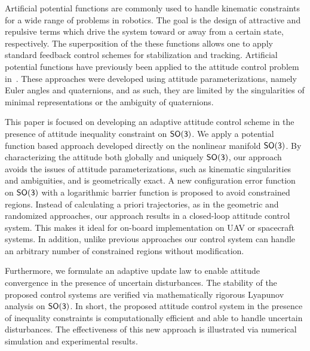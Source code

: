 \documentclass[letterpaper, 10 pt, conference]{ieeeconf}  %
\begin{document}
Artificial potential functions are commonly used to handle kinematic constraints for a wide range of problems in robotics.
The goal is the design of attractive and repulsive terms which drive the system toward or away from a certain state, respectively.
The superposition of the these functions allows one to apply standard feedback control schemes for stabilization and tracking.
Artificial potential functions have previously been applied to the attitude control problem in~\cite{lee2011b,mcinnes1994}.
These approaches were developed using attitude parameterizations, namely Euler angles and quaternions, and as such, they are limited by the singularities of minimal representations or the ambiguity of quaternions.





This paper is focused on developing an adaptive attitude control scheme in the presence of attitude inequality constraint on \(\mathsf{SO(3)}\). We apply a potential function based approach developed directly on the nonlinear manifold \(\mathsf{SO(3)}\). By characterizing the attitude both globally and uniquely \(\mathsf{SO(3)}\), our approach avoids the issues of attitude parameterizations, such as kinematic singularities and ambiguities, and is geometrically exact. A new configuration error function on \(\mathsf{SO(3)}\) with a logarithmic barrier function is proposed to avoid constrained regions. Instead of calculating a priori trajectories, as in the geometric and randomized approaches, our approach results in a closed-loop attitude control system. This makes it ideal for on-board implementation on UAV or spacecraft systems. In addition, unlike previous approaches our control system can handle an arbitrary number of constrained regions without modification.

Furthermore, we formulate an adaptive update law to enable attitude convergence in the presence of uncertain disturbances. The stability of the proposed control systems are verified via mathematically rigorous Lyapunov analysis on $\mathsf{SO(3)}$.  In short, the proposed attitude control system in the presence of inequality constraints is computationally efficient and able to handle uncertain disturbances. The effectiveness of this new approach is illustrated via numerical simulation and experimental results.%
\end{document}
